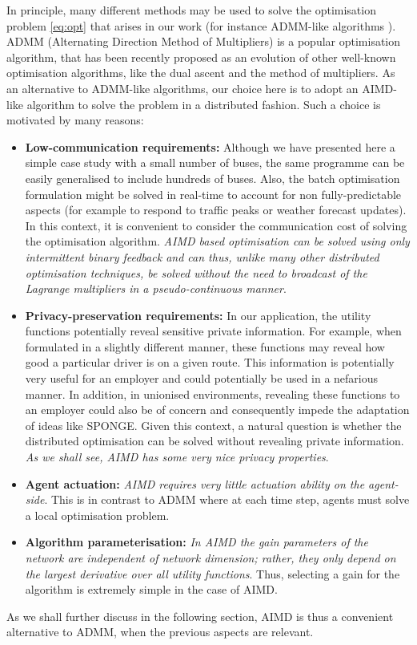 \documentclass[journal]{IEEEtran}
\begin{document}
In principle, many different methods may be used to solve the optimisation problem \eqref{eq:opt} that arises in our work  (for instance ADMM-like algorithms \cite{boyd2011distributed}). ADMM (Alternating Direction Method of Multipliers) is a popular optimisation algorithm, that has been recently proposed as an evolution of other well-known optimisation algorithms, like the dual ascent and the method of multipliers. 
As an alternative to ADMM-like algorithms, our choice here is to adopt an AIMD-like algorithm \cite{wirth2014nonhomogeneous} to solve the problem in a distributed fashion. Such a choice is motivated by many reasons: 
\begin{itemize}
	\item
	\textbf{Low-communication requirements:} Although we have presented here a simple case study with a small number of buses, the same programme can be easily generalised to include hundreds of buses. Also, the batch optimisation formulation might be solved in real-time to account for non fully-predictable aspects (for example to respond to traffic peaks or weather forecast updates). In this context, it is convenient to consider the communication cost of solving the optimisation algorithm. {\em AIMD based optimisation can be solved using only intermittent binary feedback and can thus, unlike many other distributed optimisation techniques, be solved without the need to broadcast of the Lagrange multipliers in a pseudo-continuous manner}. \newline
	\item
	\textbf{Privacy-preservation requirements:} In our application, the utility functions  potentially reveal sensitive private information. For example, when formulated in a slightly different manner, these functions  may reveal how good a particular driver is on a given route. This information is potentially very useful for an employer and could potentially be used in a nefarious manner. In addition, in unionised environments, revealing these functions to an employer could also be of concern and consequently impede the adaptation of ideas like SPONGE. Given this context, a natural question is whether the distributed optimisation can be solved without revealing private information. {\em As we shall see, AIMD has some very nice privacy properties}. \newline
	\item
	\textbf{Agent actuation:}  {\em AIMD requires very little actuation ability on the agent-side}. This is in contrast to ADMM where at each time step, agents must solve a local optimisation problem.\newline
	\item
	\textbf{Algorithm parameterisation:} {\em In AIMD the gain parameters of the network are independent of network dimension; rather, they only depend on the largest derivative over all utility functions}. Thus, selecting a gain for the algorithm is extremely simple in the case of AIMD.
\end{itemize}
As we shall further discuss in the following section, AIMD is thus a convenient alternative to ADMM, when the previous aspects are relevant.
\end{document}
